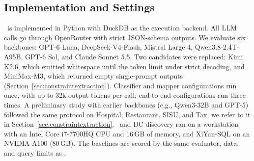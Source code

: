 \subsection{Implementation and Settings}
\label{sec:implementation}

\system\ is implemented in Python with DuckDB as the execution backend. All LLM calls go through OpenRouter with strict JSON-schema outputs. We evaluate six backbones: GPT-6 Luna, DeepSeek-V4-Flash, Mistral Large 4, Qwen3.8-2.4T-A95B, GPT-6 Sol, and Claude Sonnet 5.5. Two candidates were replaced: Kimi K2.6, which emitted whitespace until the token limit under strict decoding, and MiniMax-M3, which returned empty single-prompt outputs (Section~\ref{sec:constraintextraction}). Classifier and mapper configurations run once, with up to 32k output tokens per call; end-to-end configurations run three times. A preliminary study with earlier backbones (e.g., Qwen3-32B and GPT-5) followed the same protocol on Hospital, Restaurant, SISU, and Tax; we refer to it in Section~\ref{sec:constraintextraction}. \system\ and DC discovery ran on a workstation with an Intel Core i7-7700HQ CPU and 16\,GB of memory, and XiYan-SQL on an NVIDIA A100 (80\,GB). The baselines are scored by the same evaluator, data, and query limits as \system.
